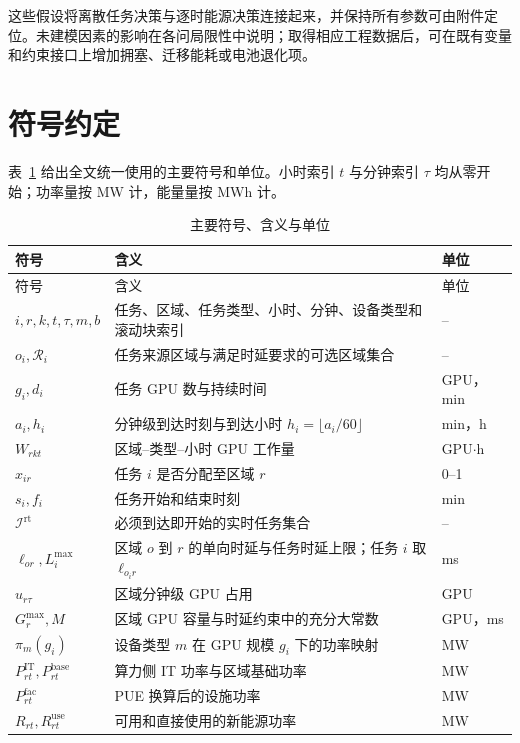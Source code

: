 这些假设将离散任务决策与逐时能源决策连接起来，并保持所有参数可由附件定位。未建模因素的影响在各问局限性中说明；取得相应工程数据后，可在既有变量和约束接口上增加拥塞、迁移能耗或电池退化项。

\section{符号约定}

表~\ref{tab:notation} 给出全文统一使用的主要符号和单位。小时索引 $t$ 与分钟索引 $\tau$ 均从零开始；功率量按 MW 计，能量量按 MWh 计。

{\small
\begin{longtable}{@{}p{}p{}p{}@{}}
\caption{主要符号、含义与单位}\label{tab:notation}\\
\toprule
符号 & 含义 & 单位 \\
\midrule
\endfirsthead
\toprule
符号 & 含义 & 单位 \\
\midrule
\endhead
$i,r,k,t,\tau,m,b$ & 任务、区域、任务类型、小时、分钟、设备类型和滚动块索引 & -- \\
$o_i,\mathcal R_i$ & 任务来源区域与满足时延要求的可选区域集合 & -- \\
$g_i,d_i$ & 任务 GPU 数与持续时间 & GPU，min \\
$a_i,h_i$ & 分钟级到达时刻与到达小时 $h_i=\lfloor a_i/60\rfloor$ & min，h \\
$W_{rkt}$ & 区域--类型--小时 GPU 工作量 & GPU$\cdot$h \\
$x_{ir}$ & 任务 $i$ 是否分配至区域 $r$ & 0--1 \\
$s_i,f_i$ & 任务开始和结束时刻 & min \\
$\mathcal I^{\mathrm{rt}}$ & 必须到达即开始的实时任务集合 & -- \\
$\ell_{or},L_i^{\max}$ & 区域 $o$ 到 $r$ 的单向时延与任务时延上限；任务 $i$ 取 $\ell_{o_i r}$ & ms \\
$u_{r\tau}$ & 区域分钟级 GPU 占用 & GPU \\
$G_r^{\max},M$ & 区域 GPU 容量与时延约束中的充分大常数 & GPU，ms \\
$\pi_m(g_i)$ & 设备类型 $m$ 在 GPU 规模 $g_i$ 下的功率映射 & MW \\
$P^{\mathrm{IT}}_{rt},P^{\mathrm{base}}_{rt}$ & 算力侧 IT 功率与区域基础功率 & MW \\
$P^{\mathrm{fac}}_{rt}$ & PUE 换算后的设施功率 & MW \\
$R_{rt},R^{\mathrm{use}}_{rt}$ & 可用和直接使用的新能源功率 & MW \\

\end{longtable}}

